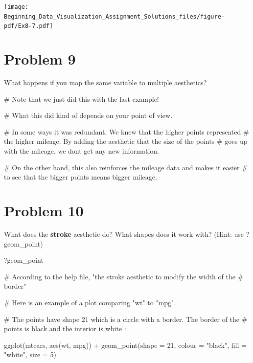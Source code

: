 \documentclass[
  letterpaper,
  DIV=11,
  numbers=noendperiod]{scrreprt}
\newenvironment{Shaded}{\begin{snugshade}}{\end{snugshade}}
\newcommand{\AttributeTok}[1]{\textcolor[rgb]{0.40,0.45,0.13}{#1}}
\newcommand{\CommentTok}[1]{\textcolor[rgb]{0.37,0.37,0.37}{#1}}
\newcommand{\DecValTok}[1]{\textcolor[rgb]{0.68,0.00,0.00}{#1}}
\newcommand{\FunctionTok}[1]{\textcolor[rgb]{0.28,0.35,0.67}{#1}}
\newcommand{\NormalTok}[1]{\textcolor[rgb]{0.00,0.23,0.31}{#1}}
\newcommand{\SpecialCharTok}[1]{\textcolor[rgb]{0.37,0.37,0.37}{#1}}
\newcommand{\StringTok}[1]{\textcolor[rgb]{0.13,0.47,0.30}{#1}}
\begin{document}
\texttt{[image: Beginning\_Data\_Visualization\_Assignment\_Solutions\_files/figure-pdf/Ex8-7.pdf]}

\section*{Problem 9}\label{problem-9-3}


What happens if you map the same variable to multiple aesthetics?

\begin{Shaded}
\begin{Highlighting}[]
\CommentTok{\# Note that we just did this with the last example! }

\CommentTok{\# What this did kind of depends on your point of view. }

\CommentTok{\# In some ways it was redundant. We knew that the higher points represented}
\CommentTok{\# the higher mileage. By adding the aesthetic that the size of the points}
\CommentTok{\# goes up with the mileage, we don\textquotesingle{}t get any new information.}

\CommentTok{\# On the other hand, this also reinforces the mileage data and makes it easier }
\CommentTok{\# to see that the bigger points means bigger mileage. }
\end{Highlighting}
\end{Shaded}

\section*{Problem 10}\label{problem-10-3}


What does the \textbf{stroke} aesthetic do? What shapes does it work
with? (Hint: use ?geom\_point)

\begin{Shaded}
\begin{Highlighting}[]
\NormalTok{?geom\_point}

\CommentTok{\# According to the help file, "the stroke aesthetic to modify the width of the}
\CommentTok{\# border"}

\CommentTok{\# Here is an example of a plot comparing "wt" to "mpg".}

\CommentTok{\# The points have shape 21 which is a circle with a border. The border of the}
\CommentTok{\# points is black and the interior is white : }

\FunctionTok{ggplot}\NormalTok{(mtcars, }\FunctionTok{aes}\NormalTok{(wt, mpg)) }\SpecialCharTok{+}
  \FunctionTok{geom\_point}\NormalTok{(}\AttributeTok{shape =} \DecValTok{21}\NormalTok{, }\AttributeTok{colour =} \StringTok{"black"}\NormalTok{, }\AttributeTok{fill =} \StringTok{"white"}\NormalTok{, }\AttributeTok{size =} \DecValTok{5}\NormalTok{)}
\end{Highlighting}
\end{Shaded}
\end{document}
